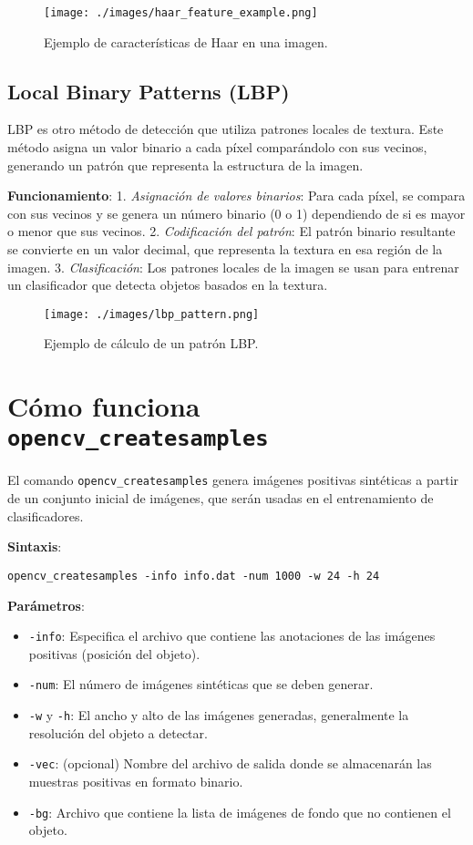 \documentclass{article}
\begin{document}
\begin{figure}[H]
    \centering
    \texttt{[image: ./images/haar\_feature\_example.png]}
    \caption{Ejemplo de características de Haar en una imagen.}
\end{figure}

\subsection{Local Binary Patterns (LBP)}
LBP es otro método de detección que utiliza patrones locales de textura. Este método asigna un valor binario a cada píxel comparándolo con sus vecinos, generando un patrón que representa la estructura de la imagen.

\textbf{Funcionamiento}:
1. \textit{Asignación de valores binarios}: Para cada píxel, se compara con sus vecinos y se genera un número binario (0 o 1) dependiendo de si es mayor o menor que sus vecinos.
2. \textit{Codificación del patrón}: El patrón binario resultante se convierte en un valor decimal, que representa la textura en esa región de la imagen.
3. \textit{Clasificación}: Los patrones locales de la imagen se usan para entrenar un clasificador que detecta objetos basados en la textura.

\begin{figure}[H]
    \centering
    \texttt{[image: ./images/lbp\_pattern.png]}
    \caption{Ejemplo de cálculo de un patrón LBP.}
\end{figure}

\section{Cómo funciona \texttt{opencv\_createsamples}}
El comando \texttt{opencv\_createsamples} genera imágenes positivas sintéticas a partir de un conjunto inicial de imágenes, que serán usadas en el entrenamiento de clasificadores.

\textbf{Sintaxis}:
\begin{verbatim}
opencv_createsamples -info info.dat -num 1000 -w 24 -h 24
\end{verbatim}

\textbf{Parámetros}:
\begin{itemize}
    \item \texttt{-info}: Especifica el archivo que contiene las anotaciones de las imágenes positivas (posición del objeto).
    \item \texttt{-num}: El número de imágenes sintéticas que se deben generar.
    \item \texttt{-w} y \texttt{-h}: El ancho y alto de las imágenes generadas, generalmente la resolución del objeto a detectar.
    \item \texttt{-vec}: (opcional) Nombre del archivo de salida donde se almacenarán las muestras positivas en formato binario.
    \item \texttt{-bg}: Archivo que contiene la lista de imágenes de fondo que no contienen el objeto.
\end{itemize}
\end{document}
